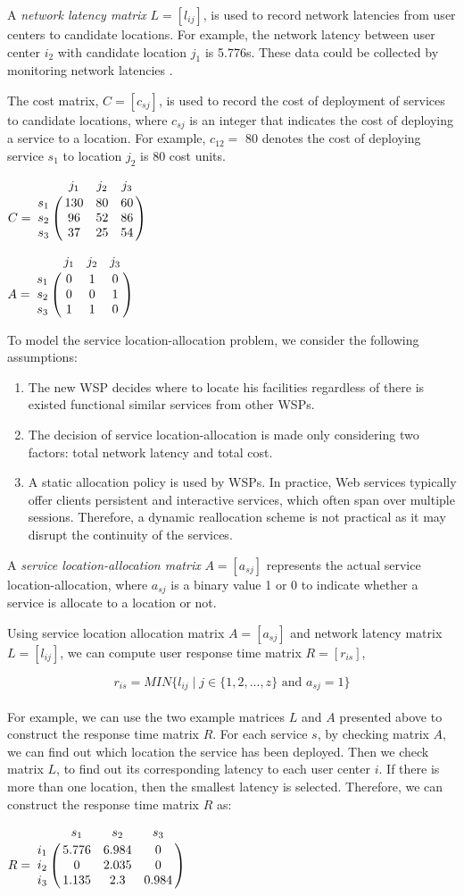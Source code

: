 A \emph{network latency matrix} $L = [l_{ij}]$, is used to record network latencies from user centers to 
candidate locations. For example, the network latency between user center $i_{2}$ with candidate location $j_{1}$ 
is 5.776s. These data could be collected by monitoring network latencies \cite{6076756} \cite{5552800}.

The cost matrix, $C = [c_{sj}]$, is used to record the cost of deployment of services to candidate locations, 
where $c_{sj}$ is an integer that indicates the cost of deploying a service to a location. 
For example, $c_{12} = $ 80 denotes the cost of deploying service $s_{1}$ to location $j_{2}$ is 80 cost units.

\parbox{.45\linewidth}{
{\centering
$
C = \bbordermatrix{~ & j_{1} & j_{2} & j_{3}\cr
					s_{1}	&130 &80 &60\cr
					s_{2}	&96  &52 &86\cr
					s_{3}	&37 &25 &54\cr}
$
\\}
}
\parbox{.45\linewidth}{
{\centering
$
A = \bbordermatrix{~ & j_{1} & j_{2} & j_{3}\cr
					s_{1}	&0 &1 &0	\cr
					s_{2}	&0  &0 &1	\cr
					s_{3}	&1 &1 &0	\cr}
$
\\}
}

To model the service location-allocation problem, we consider the following assumptions:
\begin{enumerate}
	\item The new WSP decides where to locate his facilities regardless of there is existed functional similar services from other WSPs.
	\item The decision of service location-allocation is made only considering two factors: total network latency and total cost.
	\item A static allocation policy is used by WSPs. In practice, Web services typically offer clients persistent and interactive services, which often span over multiple sessions. Therefore, a dynamic reallocation scheme is not practical as it may disrupt the continuity of the services.
\end{enumerate}


A \emph{service location-allocation matrix} $A = [a_{sj}]$ represents the actual service location-allocation, where $a_{sj}$  is a binary value 1 or 0 to indicate whether a service is allocate to a location or not.

Using service location allocation matrix $A = [a_{sj}]$ and network latency matrix $L = [l_{ij}]$, we can compute user
response time matrix $R = [r_{is}]$, 

{\centering
	\begin{equation}
		r_{is} = MIN\{l_{ij} \mid j \in \{1, 2, ..., z\} \text{ and } a_{sj} = 1\}
	\end{equation}
\\}
For example, we can use the two example matrices $L$ and $A$ presented above to construct the response time matrix $R$. 
For each service $s$, by checking matrix $A$, we can find out which location the service has been deployed.
Then we check matrix $L$, to find out its corresponding latency to each user center $i$. If there is
more than one location, then the smallest latency is selected. Therefore, we can construct the response time matrix $R$ as:

{\centering
$
R = \bbordermatrix{~ & s_{1} & s_{2} & s_{3}\cr
					i_{1}	&5.776 &6.984 &0	\cr
					i_{2}	&0  &2.035 &0	\cr
					i_{3}	&1.135 &2.3 &0.984	\cr}
$
\\}

